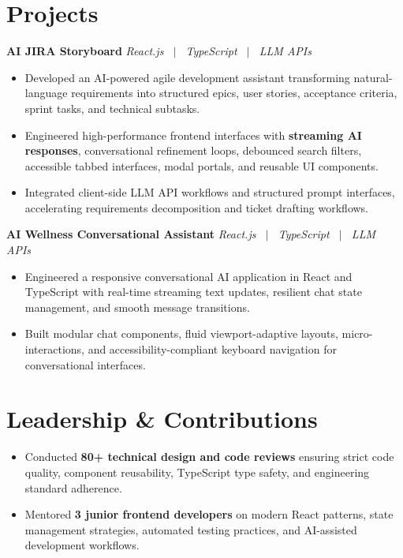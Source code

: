 \documentclass[letterpaper,10pt]{article}
\newcommand{\resumeProject}[2]{%
  \vspace{2pt}%
  \textbf{#1} \hfill \textit{#2}\\[-6pt]
}
\begin{document}
\section{Projects}

\resumeProject
  {AI JIRA Storyboard}{React.js \ $|$ \ TypeScript \ $|$ \ LLM APIs}
\begin{itemize}
  \item Developed an AI-powered agile development assistant transforming natural-language requirements into structured epics, user stories, acceptance criteria, sprint tasks, and technical subtasks.
  \item Engineered high-performance frontend interfaces with \textbf{streaming AI responses}, conversational refinement loops, debounced search filters, accessible tabbed interfaces, modal portals, and reusable UI components.
  \item Integrated client-side LLM API workflows and structured prompt interfaces, accelerating requirements decomposition and ticket drafting workflows.
\end{itemize}

\resumeProject
  {AI Wellness Conversational Assistant}{React.js \ $|$ \ TypeScript \ $|$ \ LLM APIs}
\begin{itemize}
  \item Engineered a responsive conversational AI application in React and TypeScript with real-time streaming text updates, resilient chat state management, and smooth message transitions.
  \item Built modular chat components, fluid viewport-adaptive layouts, micro-interactions, and accessibility-compliant keyboard navigation for conversational interfaces.
\end{itemize}


\section{Leadership \& Contributions}

\begin{itemize}
  \item Conducted \textbf{80+ technical design and code reviews} ensuring strict code quality, component reusability, TypeScript type safety, and engineering standard adherence.
  \item Mentored \textbf{3 junior frontend developers} on modern React patterns, state management strategies, automated testing practices, and AI-assisted development workflows.
\end{itemize}
\end{document}
